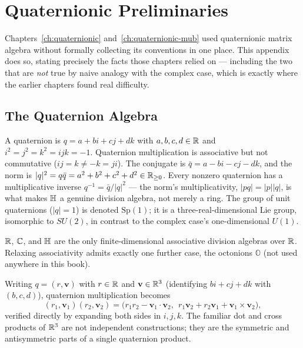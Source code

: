\chapter{Quaternionic Preliminaries}
\label{app:quaternions}

Chapters~\ref{ch:quaternionic} and~\ref{ch:quaternionic-mub} used
quaternionic matrix algebra without formally collecting its conventions in
one place. This appendix does so, stating precisely the facts those
chapters relied on — including the two that are \emph{not} true by naive
analogy with the complex case, which is exactly where the earlier chapters
found real difficulty.

\section{The Quaternion Algebra}

A quaternion is $q = a+bi+cj+dk$ with $a,b,c,d\in\mathbb{R}$ and $i^2=j^2=k^2=
ijk=-1$. Quaternion multiplication is associative but not commutative
($ij=k \ne -k = ji$). The conjugate is $\bar q = a-bi-cj-dk$, and the norm
is $|q|^2 = q\bar q = a^2+b^2+c^2+d^2 \in \mathbb{R}_{\ge0}$. Every nonzero
quaternion has a multiplicative inverse $q^{-1}=\bar q/|q|^2$ — the norm's
multiplicativity, $|pq|=|p||q|$, is what makes $\mathbb{H}$ a genuine division
algebra, not merely a ring. The group
of unit quaternions ($|q|=1$) is denoted $\mathrm{Sp}(1)$; it is a
three-real-dimensional Lie group, isomorphic to $SU(2)$, in contrast to
the complex case's one-dimensional $U(1)$.

\begin{fact}
$\mathbb{R}$, $\mathbb{C}$, and $\mathbb{H}$ are the only finite-dimensional associative
division algebras over $\mathbb{R}$. Relaxing associativity admits exactly one
further case, the octonions $\mathbb O$ (not used anywhere in this book).
\end{fact}

\begin{fact}
\label{fact:scalar-vector}
Writing $q=(r,\mathbf v)$ with $r\in\mathbb{R}$ and $\mathbf v\in\mathbb{R}^3$ (identifying
$bi+cj+dk$ with $(b,c,d)$), quaternion multiplication becomes
\begin{equation}
(r_1,\mathbf v_1)(r_2,\mathbf v_2) = \big(r_1r_2 - \mathbf v_1\cdot\mathbf
v_2,\ \ r_1\mathbf v_2+r_2\mathbf v_1+\mathbf v_1\times\mathbf v_2\big),
\end{equation}
verified directly by expanding both sides in $i,j,k$. The familiar dot and
cross products of $\mathbb{R}^3$ are not independent constructions; they are the
symmetric and antisymmetric parts of a single quaternion product.
\end{fact}

